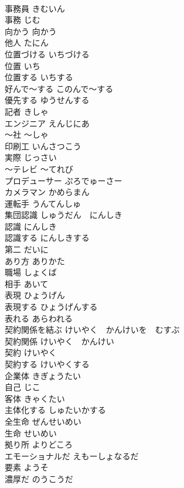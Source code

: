 \documentclass[8pt]{extreport}
\begin{document}
\begin{CJK}{UTF8}{min}
\\	事務員	きむいん	
\\	事務	じむ	
\\	向かう	向かう	
\\	他人	たにん	
\\	位置づける	いちづける	
\\	位置	いち	
\\	位置する	いちする	
\\	好んで〜する	このんで〜する	
\\	優先する	ゆうせんする	
\\	記者	きしゃ	
\\	エンジニア	えんじにあ	
\\	〜社	〜しゃ	
\\	印刷工	いんさつこう	
\\	実際	じっさい	
\\	〜テレビ	〜てれび	
\\	プロデューサー	ぷろでゅーさー	
\\	カメラマン	かめらまん	
\\	運転手	うんてんしゅ	
\\	集団認識	しゅうだん　にんしき	
\\	認識	にんしき	
\\	認識する	にんしきする	
\\	第二	だいに	
\\	あり方	ありかた	
\\	職場	しょくば	
\\	相手	あいて	
\\	表現	ひょうげん	
\\	表現する	ひょうげんする	
\\	表れる	あらわれる	
\\	契約関係を結ぶ	けいやく　かんけいを　むすぶ	
\\	契約関係	けいやく　かんけい	
\\	契約	けいやく	
\\	契約する	けいやくする	
\\	企業体	きぎょうたい	
\\	自己	じこ	
\\	客体	きゃくたい	
\\	主体化する	しゅたいかする	
\\	全生命	ぜんせいめい	
\\	生命	せいめい	
\\	拠り所	よりどころ	
\\	エモーショナルだ	えもーしょなるだ	
\\	要素	ようそ	
\\	濃厚だ	のうこうだ	

\end{CJK}
\end{document}
